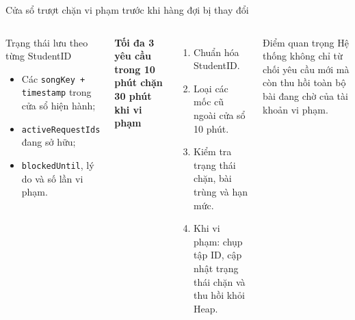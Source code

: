 \documentclass[aspectratio=169,11pt]{beamer}
\newcommand{\code}[1]{\texttt{#1}}
\newcommand{\metricline}[1]{%
  {\sffamily\small\bfseries\color{hbgreen}#1}}
\begin{document}
\begin{frame}{Cửa sổ trượt chặn vi phạm trước khi hàng đợi bị thay đổi}
\begin{columns}[T,totalwidth=\textwidth]
\begin{block}{Trạng thái lưu theo từng StudentID}
\begin{itemize}
  \item Các \code{songKey + timestamp} trong cửa sổ hiện hành;
  \item \code{activeRequestIds} đang sở hữu;
  \item \code{blockedUntil}, lý do và số lần vi phạm.
\end{itemize}
\end{block}
\begin{center}
\metricline{Tối đa 3 yêu cầu trong 10 phút \quad\textbullet\quad chặn 30 phút khi vi phạm}
\end{center}
\begin{enumerate}
  \item Chuẩn hóa StudentID.
  \item Loại các mốc cũ ngoài cửa sổ 10 phút.
  \item Kiểm tra trạng thái chặn, bài trùng và hạn mức.
  \item Khi vi phạm: chụp tập ID, cập nhật trạng thái chặn và thu hồi khỏi Heap.
\end{enumerate}
\begin{alertblock}{Điểm quan trọng}
Hệ thống không chỉ từ chối yêu cầu mới mà còn thu hồi toàn bộ bài đang chờ của tài khoản vi phạm.
\end{alertblock}
\end{columns}
\end{frame}
\end{document}
